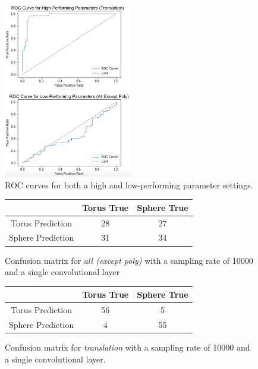 \documentclass{article}
\begin{document}
\begin{figure}
  \centering
      \includegraphics[width=0.5\textwidth]{graphics/roc.png}
    \caption{ROC curves for both a high and low-performing parameter settings.}
    \label{ROCgraph}
\end{figure}

\begin{figure}
\begin{center}
 \begin{tabular}{|c|c|c|}
 \hline
  & Torus True  & Sphere True \\ [0.5ex]
 \hline
 Torus Prediction & 28 & 27 \\
 \hline
 Sphere Prediction & 31 & 34 \\ [1ex]
 \hline
\end{tabular}
\end{center}
\caption{Confusion matrix for \textit{all (except poly)} with a sampling rate of 10000 and a single convolutional layer}
\label{confusion-binary-bad}
\end{figure}

\begin{figure}
\begin{center}
 \begin{tabular}{|c|c|c|}
 \hline
  & Torus True & Sphere True \\ [0.5ex]
 \hline
 Torus Prediction & 56 & 5 \\
 \hline
 Sphere Prediction & 4 & 55 \\ [1ex]
 \hline
\end{tabular}
\end{center}
\caption{Confusion matrix for \textit{translation} with a sampling rate of 10000 and a single convolutional layer.}
\label{confusion-binary-good}
\end{figure}
\end{document}
